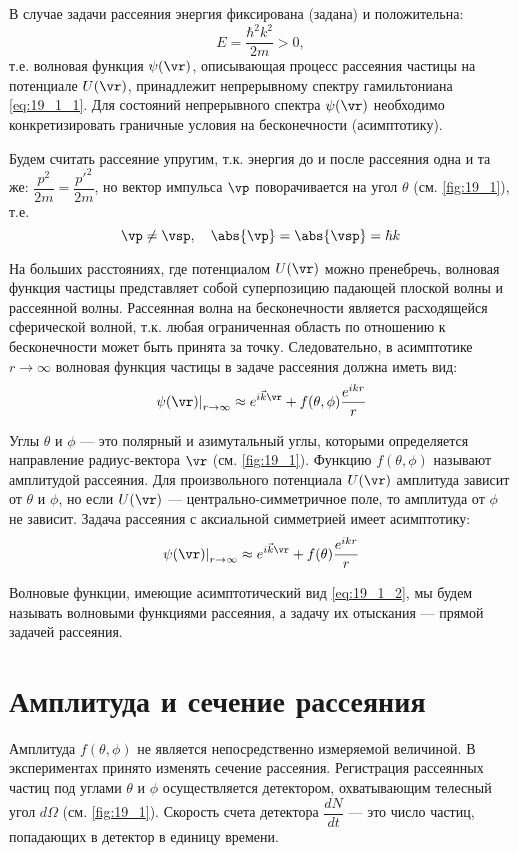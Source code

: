 В случае задачи рассеяния энергия фиксирована (задана) и положительна:
$$
E = \frac{\hbar^2 k^2}{2m} > 0,
$$
т.е. волновая функция $\psi(\vr)$, описывающая процесс рассеяния частицы на потенциале $U(\vr)$, принадлежит непрерывному спектру гамильтониана \eqref{eq:19_1_1}. Для состояний непрерывного спектра $\psi(\vr)$ необходимо конкретизировать граничные условия на бесконечности (асимптотику).

Будем считать рассеяние упругим, т.к. энергия до и после рассеяния одна и та же: $\dfrac{p^2}{2m} = \dfrac{p'^2}{2m}$, но вектор импульса $\vp$ поворачивается на угол $\theta$ (см. \autoref{fig:19_1}), т.е. 
$$
\vp \neq \vsp,~~~\abs{\vp} = \abs{\vsp} = \hbar k
$$

На больших расстояниях, где потенциалом $U(\vr)$ можно пренебречь, волновая функция частицы представляет собой суперпозицию падающей плоской волны и рассеянной волны. Рассеянная волна на бесконечности является расходящейся сферической волной, т.к. любая ограниченная область по отношению к бесконечности может быть принята за точку. Следовательно, в асимптотике $r \to \infty$ волновая функция частицы в задаче рассеяния должна иметь вид:
$$
\left . \psi(\vr) \right|_{r \to \infty} \approx e^{i \vec{k} \vr} + f(\theta, \phi) \frac{e^{ikr}}{r}
$$

Углы $\theta$ и $\phi$ --- это полярный и азимутальный углы, которыми определяется направление радиус-вектора $\vr$ (см. \autoref{fig:19_1}). Функцию $f(\theta, \phi)$ называют амплитудой рассеяния. Для произвольного потенциала $U(\vr)$ амплитуда зависит от $\theta$ и $\phi$, но если $U(\vr)$ --- центрально-симметричное поле, то амплитуда от $\phi$ не зависит. Задача рассеяния с аксиальной симметрией имеет асимптотику:
\begin{equation}
\label{eq:19_1_2}
\left . \psi(\vr) \right|_{r \to \infty} \approx e^{i \vec{k}\vr} + f(\theta) \frac{e^{ikr}}{r}
\end{equation}

Волновые функции, имеющие асимптотический вид \eqref{eq:19_1_2}, мы будем называть волновыми функциями рассеяния, а задачу их отыскания --- прямой задачей рассеяния.

\section{Амплитуда и сечение рассеяния}

Амплитуда $f(\theta, \phi)$ не является непосредственно измеряемой величиной. В экспериментах принято изменять сечение рассеяния. Регистрация рассеянных частиц под углами $\theta$ и $\phi$ осуществляется детектором, охватывающим телесный угол $d\Omega$ (см. \autoref{fig:19_1}). Скорость счета детектора $\dfrac{dN}{dt}$ --- это число частиц, попадающих в детектор в единицу времени.

